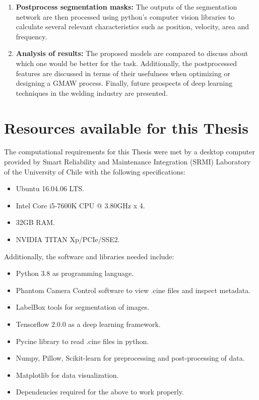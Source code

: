\begin{enumerate}
    \item \textbf{Postprocess segmentation masks:}
    The outputs of the segmentation network are then processed using python's computer vision libraries to calculate several relevant characteristics such as position, velocity, area and frequency.\\
    
    \item \textbf{Analysis of results:}
    The proposed models are compared to discuss about which one would be better for the task. Additionally, the postprocessed features are discussed in terms of their usefulness when optimizing or designing a GMAW process. Finally, future prospects of deep learning techniques in the welding industry are presented.
    
\end{enumerate}

\section{Resources available for this Thesis}
The computational requirements for this Thesis were met by a desktop computer provided by Smart Reliability and Maintenance Integration (SRMI) Laboratory of the University of Chile with the following
specifications:
\begin{itemize}
    \item Ubuntu 16.04.06 LTS.
    \item Intel Core i5-7600K CPU @ 3.80GHz x 4. 
    \item 32GB RAM.
    \item NVIDIA TITAN Xp/PCIe/SSE2.
\end{itemize}

Additionally, the software and libraries needed include:
\begin{itemize}
    \item Python 3.8 as programming language.
    \item Phantom Camera Control software to view .cine files and inspect metadata.
     \item LabelBox tools for segmentation of images.
    \item Tensorflow 2.0.0 as a deep learning framework.
    \item Pycine library to read .cine files in python.
    \item Numpy, Pillow, Scikit-learn for preprocessing and post-processing of data.
    \item Matplotlib for data visualization.
    \item Dependencies required for the above to work properly.
\end{itemize}

